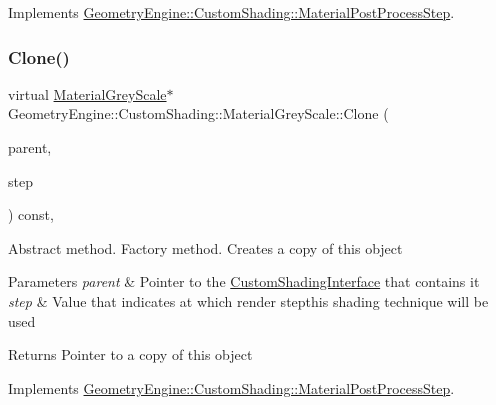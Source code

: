 Implements \mbox{\hyperlink{class_geometry_engine_1_1_custom_shading_1_1_material_post_process_step_aff4e07a7a77113c487b52bc93c2be0fa}{Geometry\+Engine\+::\+Custom\+Shading\+::\+Material\+Post\+Process\+Step}}.

\mbox{\label{class_geometry_engine_1_1_custom_shading_1_1_material_grey_scale_a41197b3565f2098a3b713b5de572f2ed}} 
\subsubsection{\texorpdfstring{Clone()}{Clone()}}
{\footnotesize\ttfamily virtual \mbox{\hyperlink{class_geometry_engine_1_1_custom_shading_1_1_material_grey_scale}{Material\+Grey\+Scale}}$\ast$ Geometry\+Engine\+::\+Custom\+Shading\+::\+Material\+Grey\+Scale\+::\+Clone (\begin{DoxyParamCaption}\item[{\mbox{\hyperlink{class_geometry_engine_1_1_custom_shading_1_1_material_post_process_interface}{Material\+Post\+Process\+Interface}} $\ast$}]{parent,  }\item[{\mbox{\hyperlink{namespace_geometry_engine_1_1_custom_shading_af8b09b91ca7086f4f67a5d4181f35e58}{Material\+Post\+Process\+Steps}}}]{step }\end{DoxyParamCaption}) const\hspace{0.3cm}{\ttfamily [inline]}, {\ttfamily [virtual]}}

Abstract method. Factory method. Creates a copy of this object 
\begin{DoxyParams}{Parameters}
{\em parent} & Pointer to the \mbox{\hyperlink{class_geometry_engine_1_1_custom_shading_1_1_custom_shading_interface}{Custom\+Shading\+Interface}} that contains it \\
\hline
{\em step} & Value that indicates at which render stepthis shading technique will be used \\
\hline
\end{DoxyParams}
\begin{DoxyReturn}{Returns}
Pointer to a copy of this object 
\end{DoxyReturn}


Implements \mbox{\hyperlink{class_geometry_engine_1_1_custom_shading_1_1_material_post_process_step_a5fd4c17faac4fea71831868027d5a516}{Geometry\+Engine\+::\+Custom\+Shading\+::\+Material\+Post\+Process\+Step}}.

